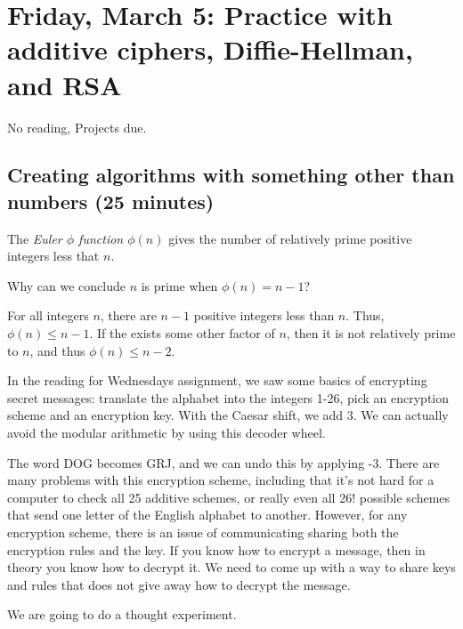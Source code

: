 \documentclass[letterpaper, 11 pt]{article}
\begin{document}
\section{Friday, March 5: Practice with additive ciphers, Diffie-Hellman, and RSA}
No reading, Projects due.
\subsection{Creating algorithms with something other than numbers (25 minutes)}
\begin{defn}
 The \emph{Euler $\phi$ function $\phi(n)$} gives the number of relatively prime positive integers less that $n$.
\end{defn}
\begin{br}[1 minute]
 Why can we conclude $n$ is prime when $\phi(n)=n-1$?
\end{br}
\begin{solution}
 For all integers $n$, there are $n-1$ positive integers less than $n$. Thus, $\phi(n)\leq n-1$. If the exists some other factor of $n$, then it is not relatively prime to $n$, and thus $\phi(n)\leq n-2$.
\end{solution}

In the reading for Wednesdays assignment, we saw some basics of encrypting secret messages: translate the alphabet into the integers 1-26, pick an encryption scheme and an encryption key. With the Caesar shift, we add 3. We can actually avoid the modular arithmetic by using this decoder wheel. 

The word DOG becomes GRJ, and we can undo this by applying -3. There are many problems with this encryption scheme, including that it's not hard for a computer to check all 25 additive schemes, or really even all 26! possible schemes that send one letter of the English alphabet to another.  However, for any encryption scheme, there is an issue of communicating sharing both the encryption rules and the key. If you know how to encrypt a message, then in theory you know how to decrypt it. We need to come up with a way to share keys and rules that does not give away how to decrypt the message.

We are going to do a thought experiment. 
\end{document}
